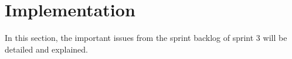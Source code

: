 \section{Implementation}
In this section, the important issues from the sprint backlog of sprint 3 will be detailed and explained.



